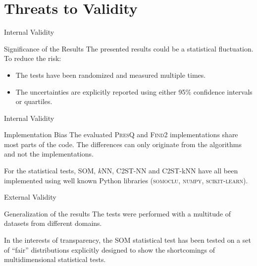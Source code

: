 \documentclass[10pt,compress]{beamer}
\newcommand{\PresQ}[0]{\textsc{PresQ}\xspace}
\begin{document}
\section{Threats to Validity}

\begin{frame}{Internal Validity}
    \begin{alertblock}{Significance of the Results}
        \smallskip
        The presented results could be a statistical fluctuation. To reduce the risk:
        
        \begin{itemize}
            \item The tests have been randomized and measured multiple times.
            \item The uncertainties are explicitly reported using either 95\% confidence intervals or quartiles.
        \end{itemize}
    \end{alertblock}
\end{frame}

\begin{frame}{Internal Validity}
    \begin{alertblock}{Implementation Bias}
        \smallskip
        The evaluated \PresQ and \textsc{Find2} implementations share most parts of the code. The differences can only originate
        from the algorithms and not the implementations.
        
        \smallskip
        
        For the statistical tests, SOM, $k$NN, C2ST-NN and C2ST-kNN have all been implemented using well known
        Python libraries (\textsc{somoclu}, \textsc{numpy}, \textsc{scikit-learn}).
    \end{alertblock}
\end{frame}

\begin{frame}{External Validity}
    \begin{alertblock}{Generalization of the results}
        \smallskip
        The tests were performed with a multitude of datasets from different domains.
        
        \smallskip

        In the interests of transparency, the SOM statistical test has been tested on a set
        of ``fair'' distributions explicitly designed to show the shortcomings of multidimensional statistical tests.
        
    \end{alertblock}
\end{frame}
\end{document}
